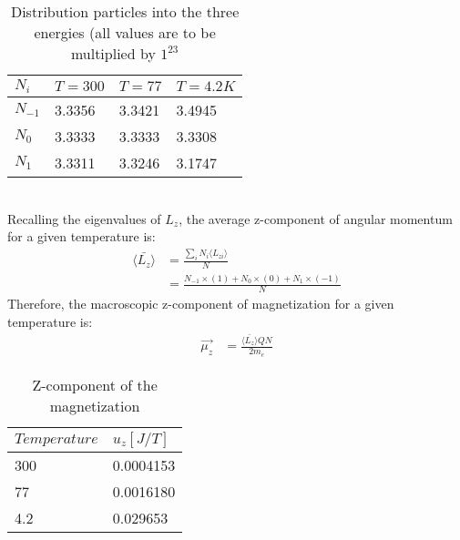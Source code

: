 \documentclass{article}
\numberwithin{equation}{section}
\begin{document}
\\
\\
\begin{table} [h!]
 \begin{center}
  \begin{tabular}{| l |l |l |l|}
  \hline
  $N_i$ & $T=300$ & $T=77$& $T=4.2K$\\
  \hline
   $N_{-1}$& 3.3356&    3.3421&    3.4945\\ \hline
   $N_0$& 3.3333&    3.3333&    3.3308\\ \hline
   $N_{1}$& 3.3311&    3.3246&    3.1747\\ \hline
  \end{tabular}
  \caption{Distribution particles into the three energies (all values are to be multiplied by $1^{23}$}
 \end{center}
\end{table}
\\
Recalling the eigenvalues of $L_z$, the average z-component of angular momentum for a given temperature is:
\begin{align*}
	\bar{\langle L_z \rangle}&=\frac{\sum_i N_i\langle L_{zi} \rangle}{N}\\
				 &=\frac{N_{-1}\times(1)+N_{0}\times(0)+N_{1}\times(-1)}{N}	
\end{align*}
Therefore, the macroscopic z-component of magnetization for a given temperature is:
\begin{align*}
\vec{\mu_z}&=\frac{\bar{\langle L_z \rangle} QN}{2m_e}
\end{align*}
\begin{table} [h!]
 \begin{center}
  \begin{tabular}{| l |l |}
  \hline
  $Temperature$ & $u_z [J/T]$\\
  \hline
   300& 0.0004153\\ \hline
   77& 0.0016180\\ \hline
   4.2& 0.029653\\ \hline
  \end{tabular}
\caption{Z-component of the magnetization}
 \end{center}
\end{table}
\end{document}
